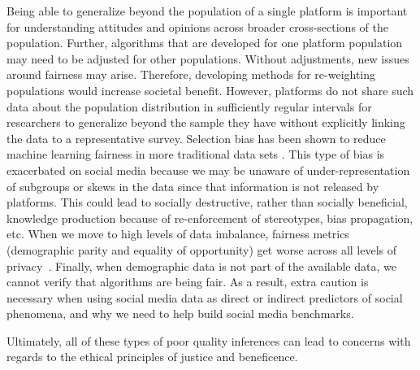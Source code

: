 \documentclass[11pt]{article} %
\begin{document}
Being able to generalize beyond the population of a single platform is important for understanding attitudes and opinions across broader cross-sections of the population. Further, algorithms that are developed for one platform population may need to be adjusted for other populations. Without adjustments, new issues around fairness may arise. Therefore, developing methods for re-weighting populations would increase societal benefit. However, platforms do not share such data about the population distribution in sufficiently regular intervals for researchers to generalize beyond the sample they have without explicitly linking the data to a representative survey. Selection bias has been shown to reduce machine learning fairness in more traditional data sets \cite{suresh2020framework,Kamiran2011DataPT}. This type of bias is exacerbated on social media because we may be unaware of under-representation of subgroups or skews in the data since that information is not released by platforms. This could lead to socially destructive, rather than socially beneficial, knowledge production because of re-enforcement of stereotypes, bias propagation, etc. When we move to high levels of data imbalance, fairness metrics (demographic parity and equality of opportunity) get worse across all levels of privacy~\cite{farrand2020}. Finally, when demographic data is not part of the available data, we cannot verify that algorithms are being fair. As a result, extra caution is necessary when using social media data as direct \cite{de2013predicting} or indirect \cite{10.1145/3292500.3330774}  predictors of social phenomena, and why we need to help build social media benchmarks. 

Ultimately, all of these types of poor quality inferences can lead to concerns with regards to the ethical principles of justice and beneficence. 
\end{document}
